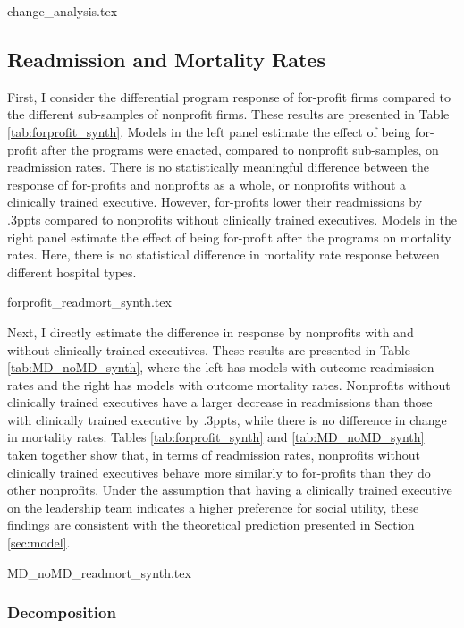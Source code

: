 \documentclass[12pt]{article}
\begin{document}
     {change_analysis.tex}

     
     \subsection{Readmission and Mortality Rates}

     First, I consider the differential program response of for-profit firms compared to the different sub-samples of nonprofit firms. These results are presented in Table \ref{tab:forprofit_synth}. Models in the left panel estimate the effect of being for-profit after the programs were enacted, compared to nonprofit sub-samples, on readmission rates. There is no statistically meaningful difference between the response of for-profits and nonprofits as a whole, or nonprofits without a clinically trained executive. However, for-profits lower their readmissions by .3ppts compared to nonprofits without clinically trained executives. Models in the right panel estimate the effect of being for-profit after the programs on mortality rates. Here, there is no statistical difference in mortality rate response between different hospital types. 

     {forprofit_readmort_synth.tex}

     Next, I directly estimate the difference in response by nonprofits with and without clinically trained executives. These results are presented in Table \ref{tab:MD_noMD_synth}, where the left has models with outcome readmission rates and the right has models with outcome mortality rates. Nonprofits without clinically trained executives have a larger decrease in readmissions than those with clinically trained executive by .3ppts, while there is no difference in change in mortality rates. Tables \ref{tab:forprofit_synth} and \ref{tab:MD_noMD_synth} taken together show that, in terms of readmission rates, nonprofits without clinically trained executives behave more similarly to for-profits than they do other nonprofits. Under the assumption that having a clinically trained executive on the leadership team indicates a higher preference for social utility, these findings are consistent with the theoretical prediction presented in Section \ref{sec:model}. 

     {MD_noMD_readmort_synth.tex}

    \subsubsection{Decomposition}
\end{document}

